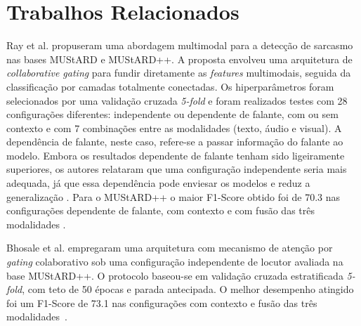 \documentclass[conference]{IEEEtran}
\begin{document}

\section{Trabalhos Relacionados}
\label{sec:related_work}


Ray et al. propuseram uma abordagem multimodal para a detecção de sarcasmo nas bases MUStARD e MUStARD++. A proposta envolveu uma arquitetura de \textit{collaborative gating} para fundir diretamente as \textit{features} multimodais, seguida da classificação por camadas totalmente conectadas. Os hiperparâmetros foram selecionados por uma validação cruzada \textit{5-fold} e foram realizados testes com 28 configurações diferentes: independente ou dependente de falante, com ou sem contexto e com 7 combinações entre as modalidades (texto, áudio e visual). A dependência de falante, neste caso, refere-se a passar informação do falante ao modelo. Embora os resultados dependente de falante tenham sido ligeiramente superiores, os autores relataram que uma configuração independente seria mais adequada, já que essa dependência pode enviesar os modelos e reduz a generalização \cite{wang2026bottleneck}. Para o MUStARD++ o maior F1-Score obtido foi de 70.3 nas configurações dependente de falante, com contexto e com fusão das três modalidades \cite{ray2022multimodal}.

Bhosale et al. empregaram uma arquitetura com mecanismo de atenção por \textit{gating} colaborativo sob uma configuração independente de locutor avaliada na base MUStARD++. O protocolo baseou-se em validação cruzada estratificada \textit{5-fold}, com teto de 50 épocas e parada antecipada. O melhor desempenho atingido foi um F1-Score de 73.1 nas configurações com contexto e fusão das três modalidades~\cite{bhosale2023mustard++}.
\end{document}
